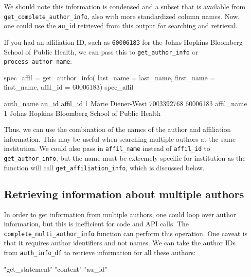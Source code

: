We should note this information is condensed and a subset that is
available from \texttt{get\_complete\_author\_info}, also with more
standardized column names. Now, one could use the \texttt{au\_id}
retrieved from this output for searching and retrieval.

If you had an affiliation ID, such as \texttt{60006183} for the Johns
Hopkins Bloomberg School of Public Health, we can pass this to
\texttt{get\_author\_info} or \texttt{process\_author\_name}:

\begin{Schunk}
\begin{Sinput}
spec_affil = get_author_info(
  last_name = last_name, 
  first_name = first_name,
  affil_id = 60006183)
spec_affil
\end{Sinput}
\begin{Soutput}
          auth_name      au_id affil_id
1 Marie Diener-West 7003392768 60006183
                                       affil_name
1 Johns Hopkins Bloomberg School of Public Health
\end{Soutput}
\end{Schunk}

Thus, we can use the combination of the names of the author and
affiliation information. This may be useful when searching multiple
authors at the same institution. We could also pass in
\texttt{affil\_name} instead of \texttt{affil\_id} to
\texttt{get\_author\_info}, but the name must be extremely specific for
institution as the function will call \texttt{get\_affiliation\_info},
which is discussed below.

\hypertarget{retrieving-information-about-multiple-authors}{%
\subsection{Retrieving information about multiple
authors}\label{retrieving-information-about-multiple-authors}}

In order to get information from multiple authors, one could loop over
author information, but this is inefficient for code and API calls. The
\texttt{complete\_multi\_author\_info} function can perform this
operation. One caveat is that it requires author identifiers and not
names. We can take the author IDs from \texttt{auth\_info\_df} to
retrieve information for all these authors:

\begin{Schunk}
\begin{Soutput}
[1] "get_statement" "content"       "au_id"        
\end{Soutput}
\end{Schunk}

